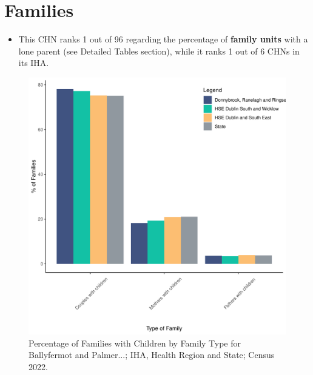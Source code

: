 \documentclass{article}
\begin{document}
\section{Families}\label{sect:Fam}
\begin{itemize}
\item This CHN ranks  1 out of 96 regarding the percentage of \textbf{family units} with a lone parent (see Detailed Tables section), while it ranks   1 out of 6 CHNs in its IHA.
\end{itemize}
\begin{figure}[H]
	\centering
	\includegraphics[width = 150mm]{../figures/FamED.pdf}
	\caption{Percentage of Families with Children by Family Type for Ballyfermot and Palmer...; IHA, Health Region and State; Census 2022.}
	\label{fig:vbnv}
	\end{figure}
	
\end{document}
